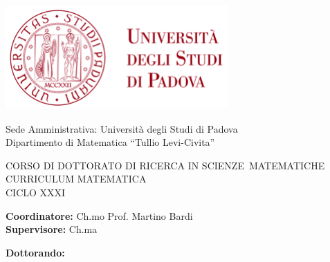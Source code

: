 
\begin{titlepage}
  \begin{addmargin}[-1cm]{-3cm}
    \begin{center}
      \includegraphics{gfx/logo-unipd-color}
    \end{center}
    \medskip
    \large

    \begin{flushleft}
      Sede Amministrativa: Università degli Studi di Padova\\
      \vspace{0.5cm}
      Dipartimento di Matematica ``Tullio Levi-Civita''
    \end{flushleft}

    \medskip
    \begin{flushleft}
      CORSO DI DOTTORATO DI RICERCA IN SCIENZE~MATEMATICHE\\
      \medskip
      CURRICULUM MATEMATICA\\
      \medskip
      CICLO XXXI
    \end{flushleft}
    \vspace{3.7cm}

    \LARGE
    \begin{center}\textsc{\textbf{\spacedallcaps{\myTitle}}}
    \end{center}
    \large



    \vspace{3.7cm}
    \begin{flushleft}
      \textbf{Coordinatore:} Ch.mo Prof. Martino Bardi\\
      \medskip
      \textbf{Supervisore:} Ch.ma \myProf
      \medskip
    \end{flushleft}
    \medskip
    \begin{flushright}
      \textbf{Dottorando:} \myName
      \medskip
    \end{flushright}
    \normalsize


  \end{addmargin}

\end{titlepage}
